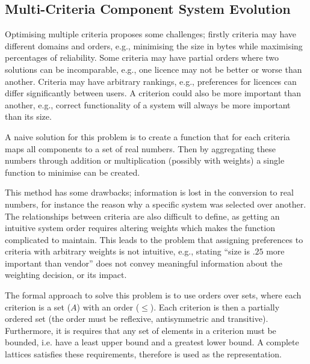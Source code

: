\subsection{Multi-Criteria Component System Evolution}
Optimising multiple criteria proposes some challenges; firstly criteria may have different domains and orders, 
e.g., minimising the size in bytes while maximising percentages of reliability. 
Some criteria may have partial orders where two solutions can be incomparable,
e.g., one licence may not be better or worse than another.
Criteria may have arbitrary rankings, 
e.g., preferences for licences can differ significantly between users.
A criterion could also be more important than another, 
e.g., correct functionality of a system will always be more important than its size.

A naive solution for this problem is to create a function that for each criteria maps all components to a set of real numbers.
Then by aggregating these numbers through addition or multiplication (possibly with weights) a single function to minimise can be created. 

This method has some drawbacks; information is lost in the conversion to real numbers, for instance the reason why a specific system was selected over another.
The relationships between criteria are also difficult to define, as getting an intuitive system order requires altering weights which makes the function complicated to maintain.
This leads to the problem that assigning preferences to criteria with arbitrary weights is not intuitive,
e.g., stating ``size is $.25$ more important than vendor'' does not convey meaningful information about the weighting decision, or its impact.

The formal approach to solve this problem is to use orders over sets, 
where each criterion is a set ($A$) with an order ($\leq$).
Each criterion is then a partially ordered set (the order must be reflexive, antisymmetric and transitive).
Furthermore, it is requires that any set of elements in a criterion must be bounded, 
i.e. have a least upper bound and a greatest lower bound.
A complete lattices satisfies these requirements, therefore is used as the representation. 

